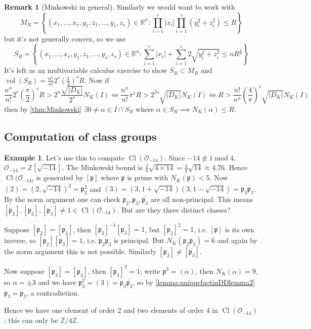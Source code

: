 \documentclass{article}
\newcommand{\Z}{\mathbb{Z}}
\newcommand{\R}{\mathbb{R}}
\newcommand{\Mod}{\operatorname{mod}}
\newcommand{\Cl}{\operatorname{Cl}}
\newcommand{\vol}{\operatorname{vol}}
\newcommand{\ri}{\mathcal{O}}
\newcommand{\ip}{\mathfrak{p}}
\theoremstyle{definition}
\newtheorem{example}[defn]{Example}
\newtheorem{remark}[defn]{Remark}
\begin{document}
\begin{remark}[Minkowski in general]
Similarly we would want to work with
\[
M_R=\left\{(x_1,\ldots,x_r,y_1,z_1,\ldots,y_s,z_s)\in\R^n:\prod_{i=1}^r|x_i|\prod_{i=1}^s\left(y_i^2+z_i^2\right)\leq R\right\}
\]
but it's not generally convex, so we use
\[
S_R=\left\{(x_1,\ldots,x_r,y_1,z_1,\ldots,y_s,z_s)\in\R^n:\sum_{i=1}^r|x_i|+\sum_{i=1}^s 2\sqrt{y_i^2+z_i^2}\leq n R^{\frac{1}{n}}\right\}
\]
It's left as an multivariable calculus exercise to show $S_R\subset M_R$ and $\vol(S_R)=\frac{n^n}{n!}2^r\left(\frac{\pi}{2}\right)^sR$. Now if
\[
\frac{n^n}{n!}2^r\left(\frac{\pi}{2}\right)^sR>2^n \frac{\sqrt{|D_K|}}{2^s} N_K(I) \iff \frac{n^n}{n!} \pi^s R>2^{2s}\sqrt{|D_K|}N_K(I) \iff R>\frac{n!}{n^n}\left(\frac{4}{\pi}\right)^s\sqrt{|D_K|}N_K(I)
\]
then by \ref{thm:Minkowski} $\exists 0\neq\alpha\in I\cap S_R$ where $\alpha\in S_R\implies N_K(\alpha)\leq R$.
\end{remark}

\subsection{Computation of class groups}

\begin{example}
\label{example:clgrpm14}
Let's use this to compute $\Cl(\ri_{-14})$. Since $-14\nequiv 1\Mod 4$, $\ri_{-14}=\Z\left[\sqrt{-14}\right]$. The Minkowski bound is $\frac{2}{\pi}\sqrt{4\times 14}=\frac{4}{\pi}\sqrt{14}\approx 4.76$. Hence $\Cl(\ri_{-14)}$ is generated by $[\ip]$ where $\ip$ is prime with $N_K(\ip)<5$. Now $(2)=\left(2,\sqrt{-14}\right)^2=\ip_2^2$ and $(3)=\left(3,1+\sqrt{-14}\right)\left(3,1-\sqrt{-14}\right)=\ip_3\overline{\ip_3}$. By the norm argument one can check $\ip_2,\ip_3,\overline{\ip_3}$ are all non-principal. This means $[\ip_2],[\ip_3],[\overline{\ip_3}]\neq 1\in\Cl(\ri_{-14})$. But are they three distinct classes?

Suppose $[\ip_2]=[\ip_3]$, then $[\ip_3]^{-1}[\ip_3]=1$, but $[\ip_2]^2=1$, i.e. $[\ip]$ is its own inverse, so $[\ip_2][\ip_3]=1$, i.e. $\ip_2\ip_3$ is principal. But $N_K(\ip_2\ip_3)=6$ and again by the norm argument this is not possible. Similarly $[\ip_2]\neq[\overline{\ip_3}]$.

Now suppose $[\ip_3]=[\overline{\ip_3}]$, then $[\ip_3]^2=1$; write $\ip^3=(\alpha)$, then $N_K(\alpha)=9$, so $\alpha=\pm 3$ and we have $\ip_3^2=(3)=\ip_3\overline{\ip_3}$, so by \ref{lemma:uniquefactinDDlemma2} $\ip_3=\overline{\ip_3}$, a contradiction.

Hence we have one element of order 2 and two elements of order 4 in $\Cl(\ri_{-14})$; this can only be $\Z/4\Z$.
\end{example}
\end{document}
